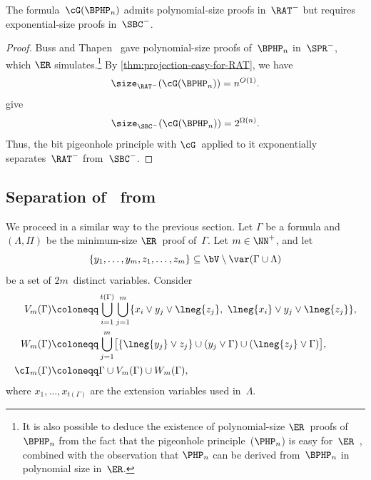 \documentclass[10pt,a4paper]{article}
\begin{document}
\begin{theorem}\label{thm:separation-RAT-from-SBC}
  The formula~$\cG(\BPHP_n)$ admits polynomial-size proofs in~$\RAT^-$
  but requires exponential-size proofs in~$\SBC^-$.
\end{theorem}
\begin{proof}
  Buss and Thapen~\cite[Theorem~4.4]{BT21}
  gave polynomial-size proofs of~$\BPHP_n$
  in~$\SPR^-$, which $\ER$ simulates.\footnote{
    It is also possible to deduce the existence of polynomial-size $\ER$~proofs
    of~$\BPHP_n$ from the fact that the pigeonhole principle~($\PHP_n$)
    is easy for~$\ER$~\cite{Coo76}, combined with the observation
    that $\PHP_n$ can be derived from~$\BPHP_n$ in polynomial size in~$\ER$.}
  By \cref{thm:projection-easy-for-RAT}, we have
  \begin{equation*}
    \size_{\RAT^-}(\cG(\BPHP_n)) = n^{O(1)}.
  \end{equation*}
   give
  \begin{equation*}
    \size_{\SBC^-}(\cG(\BPHP_n)) = 2^{\Omega(n)}.
  \end{equation*}
  Thus, the bit pigeonhole principle with $\cG$~applied to it
  exponentially separates~$\RAT^-$ from~$\SBC^-$.
\end{proof}

\subsection{Separation of~ from~}
\label{sec:GER-from-SBC}

We proceed in a similar way to the previous section.
Let $\Gamma$ be a formula and $(\Lambda, \Pi)$ be
the minimum-size $\ER$~proof of~$\Gamma$.
Let $m \in \NN^+$, and let
\begin{equation*}
  \left\{y_1, \dots, y_m, z_1, \dots, z_m\right\}
  \subseteq \bV \setminus \var(\Gamma \cup \Lambda)
\end{equation*}
be a set of $2m$~distinct variables.
Consider
\begin{align}\label{eq:blocked-pair-with-unsatisfiable-projection-transformation}
  \begin{split}
    V_m(\Gamma)
    &\coloneqq \bigcup_{i = 1}^{t(\Gamma)} \bigcup_{j = 1}^m
      \{x_i \lor y_j \lor \lneg{z_j},\ \lneg{x_i} \lor y_j \lor \lneg{z_j}\}, \\
    W_m(\Gamma)
    &\coloneqq \bigcup_{j = 1}^m \bigl[
      \{\lneg{y_j} \lor z_j\}
      \cup (y_j \lor \Gamma)
      \cup (\lneg{z_j} \lor \Gamma)
      \bigr], \\
    \cI_m(\Gamma)
    &\coloneqq \Gamma \cup V_m(\Gamma) \cup W_m(\Gamma),
  \end{split}
\end{align}
where $x_1, \dots, x_{t(\Gamma)}$ are the extension variables used in~$\Lambda$.
\end{document}
